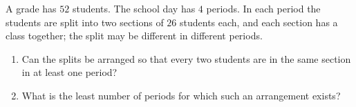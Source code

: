 A grade has $52$ students. The school day has $4$ periods. In each period the students are split into two sections of $26$ students each, and each section has a class together; the split may be different in different periods.
\begin{enumerate}
\item[(a)] Can the splits be arranged so that every two students are in the same section in at least one period?
\item[(b)] What is the least number of periods for which such an arrangement exists?
\end{enumerate}
